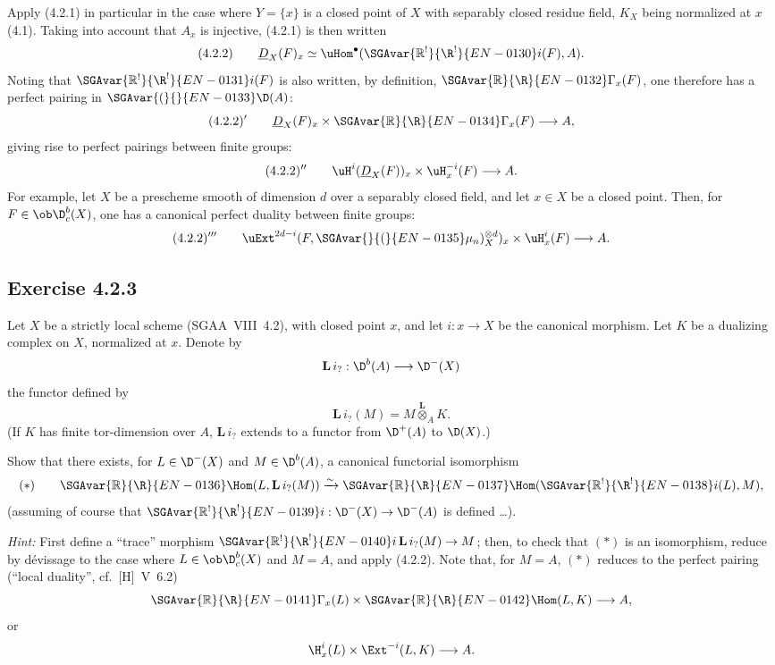 Apply (4.2.1) in particular in the case where $Y=\{x\}$ is a closed point of $X$ with separably closed residue field, $K_X$ being normalized at $x$ (4.1). Taking into account that $A_x$ is injective, (4.2.1) is then written
\[
(4.2.2)\qquad \underline{D}_X(F)_x\simeq\uHom^{\bullet}(\SGAvar{\mathbb{R}^{!}}{\R^{!}}{EN-0130}i(F),A).
\]
Noting that $\SGAvar{\mathbb{R}^{!}}{\R^{!}}{EN-0131}i(F)$ is also written, by definition, $\SGAvar{\mathbb{R}}{\R}{EN-0132}\Gamma_x(F)$, one therefore has a perfect pairing in $\SGAvar{(}{}{EN-0133}\D(A)$:
\[
(4.2.2)'\qquad \underline{D}_X(F)_x\times \SGAvar{\mathbb{R}}{\R}{EN-0134}\Gamma_x(F)\longrightarrow A,
\]
giving rise to perfect pairings between finite groups:
\[
(4.2.2)''\qquad \uH^i(\underline{D}_X(F))_x\times \uH_x^{-i}(F)\longrightarrow A.
\]
For example, let $X$ be a prescheme smooth of dimension $d$ over a separably closed field, and let $x\in X$ be a closed point. Then, for $F\in\ob\D_c^b(X)$, one has a canonical perfect duality between finite groups:
\[
(4.2.2)'''\qquad \uExt^{2d-i}(F,\SGAvar{}{(}{EN-0135}\mu_n)_X^{\otimes d})_x\times \uH_x^i(F)\longrightarrow A.
\]

\subsection*{Exercise 4.2.3}
Let $X$ be a strictly local scheme (SGAA~VIII~4.2), with closed point $x$, and let $i:x\to X$ be the canonical morphism. Let $K$ be a dualizing complex on $X$, normalized at $x$. Denote by
\[
\mathbf L\, i_? : \D^b(A)\longrightarrow \D^-(X)
\]
the functor defined by
\[
\mathbf L\, i_?(M)=M\overset{\mathbf L}{\otimes}_A K.
\]
(If $K$ has finite tor-dimension over $A$, $\mathbf L\, i_?$ extends to a functor from $\D^+(A)$ to $\D(X)$.)

Show that there exists, for $L\in\D^-(X)$ and $M\in\D^b(A)$, a canonical functorial isomorphism
\[
(*)\qquad \SGAvar{\mathbb{R}}{\R}{EN-0136}\Hom(L,\mathbf L\, i_?(M))\xrightarrow{\sim}\SGAvar{\mathbb{R}}{\R}{EN-0137}\Hom(\SGAvar{\mathbb{R}^{!}}{\R^{!}}{EN-0138}i(L),M),
\]
(assuming of course that $\SGAvar{\mathbb{R}^{!}}{\R^{!}}{EN-0139}i:\D^-(X)\to\D^-(A)$ is defined \dots).

\emph{Hint:} First define a ``trace'' morphism $\SGAvar{\mathbb{R}^{!}}{\R^{!}}{EN-0140}i\,\mathbf L\, i_?(M)\to M$; then, to check that $(*)$ is an isomorphism, reduce by dévissage to the case where $L\in\ob\D_c^b(X)$ and $M=A$, and apply (4.2.2). Note that, for $M=A$, $(*)$ reduces to the perfect pairing (``local duality'', cf.~[H]~V~6.2)
\[
\SGAvar{\mathbb{R}}{\R}{EN-0141}\Gamma_x(L)\times \SGAvar{\mathbb{R}}{\R}{EN-0142}\Hom(L,K)\longrightarrow A,
\]
or
\[
\H_x^i(L)\times \Ext^{-i}(L,K)\longrightarrow A.
\]

